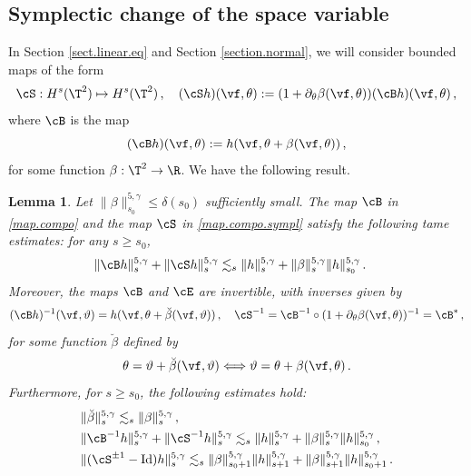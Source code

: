 \documentclass[a4paper,reqno,10pt]{article}
\newtheorem{lem}{Lemma}[section]
\newcommand{\pa}{\partial}
\begin{document}
\subsection{Symplectic change of the space variable}

In Section \ref{sect.linear.eq} and Section \ref{section.normal}, we will consider bounded maps of the form
\begin{equation}\label{map.compo.sympl}
	\cS: H^{s}(\T^2) \mapsto H^{s}(\T^2) \,, \quad (\cS h)(\vf,\theta) := (1+ \pa_{\theta}\beta(\vf,\theta)) (\cB h)(\vf,\theta)\,,
\end{equation}
where $\cB$ is the map
\begin{equation}\label{map.compo}
	(\cB h)(\vf,\theta) := h(\vf,\theta+\beta(\vf,\theta))\,,
\end{equation}
for some function $\beta:\T^2 \to \R$. We have the following result.
\begin{lem}\label{lemma.diffeo.gen}
	Let $\| \beta\|_{s_0}^{5,\gamma}\leq \delta(s_0)$ sufficiently small. The map $\cB$ in \eqref{map.compo} and the  map $\cS$ in \eqref{map.compo.sympl} satisfy the following tame estimates: for any $s\geq s_0$,
	\begin{equation}
	\begin{aligned}
			\| \cB h \|_{s}^{5,\gamma}+	\| \cS h \|_{s}^{5,\gamma}  &  \lesssim_{s} \| h \|_{s}^{5,\gamma} + \| \beta \|_{s}^{5,\gamma} \| h \|_{s_0}^{5,\gamma} \,.
	\end{aligned}
	\end{equation}
	Moreover, the maps $\cB$ and $\cE$ are invertible, with inverses given by
	\begin{equation}
		(\cB h)^{-1}(\vf,\vartheta) = h(\vf,\theta+\breve{\beta}(\vf,\vartheta)) \,, \quad \cS^{-1} = \cB^{-1} \circ (1+\pa_{\theta} \beta(\vf,\theta))^{-1} = \cB^{*} \,,
 	\end{equation}
for some function $\breve{\beta}$ defined by
\[
\theta=\vartheta+\breve{\beta}(\vf,\vartheta) \Longleftrightarrow \vartheta=\theta+\beta(\vf,\theta)\,.
\]
Furthermore, for $s\geq s_0$, the following estimates hold:
 	\begin{equation}
 		\begin{aligned}
 		&	\| \breve{\beta} \|_{s}^{5,\gamma} \lesssim_{s} \| \beta \|_{s}^{5,\gamma} \,, \\
 			&	\| \cB^{-1} h \|_{s}^{5,\gamma} +\| \cS^{-1} h \|_{s}^{5,\gamma} \lesssim_{s} \| h \|_{s}^{5,\gamma} + \| \beta \|_{s}^{5,\gamma} \| h \|_{s_0}^{5,\gamma} \,, \\
 			& 	\| (\cS^{\pm 1} -{\rm Id} ) h \|_{s}^{5,\gamma} \lesssim_{s}  \| \beta\|_{s_0+1}^{5,\gamma} \| h \|_{s+1}^{5,\gamma} + \| \beta \|_{s+1}^{5,\gamma} \| h \|_{s_0+1}^{5,\gamma} \,.
 		\end{aligned}
 	\end{equation}
\end{lem}
\end{document}
